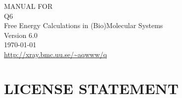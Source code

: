 \documentclass[a4paper,11pt]{article}
\newcommand{\dirfig}{./pictures}
\begin{document}
\setcaptionmargin{0.5cm} %
\thispagestyle{empty}
\begin{figure}[h]
\begin{center}
\end{center}
\end{figure}
\begin{center}
\Huge{M}\huge{ANUAL} \huge{FOR}\\
\Huge{Q}6\\
	Free Energy Calculations in (Bio)Molecular Systems\\
\vspace{0.7cm}
\large{Version 6.0\\
	\today}\\
\large{\url{http://xray.bmc.uu.se/~aqwww/q}}
\end{center}







\newpage

\tableofcontents

\newpage

\section{LICENSE STATEMENT}
%

\end{document}
